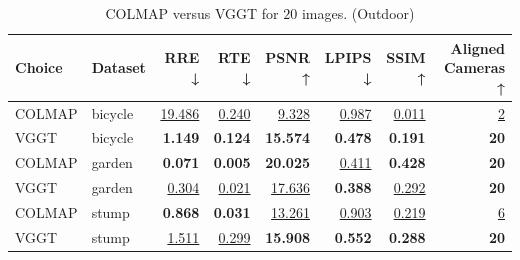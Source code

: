 \begin{table}[H]
\caption{COLMAP versus VGGT for $20$ images. (Outdoor)}
\label{tab:01_num_images_sparse_outdoor}
\centering
\scriptsize
\begin{tabular}{llrrrrrr}
\toprule
Choice & Dataset & RRE ↓ & RTE ↓ & PSNR ↑ & LPIPS ↓ & SSIM ↑ & Aligned Cameras ↑ \\
\midrule
COLMAP & bicycle & \underline{19.486} & \underline{0.240} & \underline{9.328} & \underline{0.987} & \underline{0.011} & \underline{2} \\
VGGT & bicycle & \textbf{1.149} & \textbf{0.124} & \textbf{15.574} & \textbf{0.478} & \textbf{0.191} & \textbf{20} \\
\midrule
COLMAP & garden & \textbf{0.071} & \textbf{0.005} & \textbf{20.025} & \underline{0.411} & \textbf{0.428} & \textbf{20} \\
VGGT & garden & \underline{0.304} & \underline{0.021} & \underline{17.636} & \textbf{0.388} & \underline{0.292} & \textbf{20} \\
\midrule
COLMAP & stump & \textbf{0.868} & \textbf{0.031} & \underline{13.261} & \underline{0.903} & \underline{0.219} & \underline{6} \\
VGGT & stump & \underline{1.511} & \underline{0.299} & \textbf{15.908} & \textbf{0.552} & \textbf{0.288} & \textbf{20} \\
\bottomrule
\end{tabular}
\end{table}